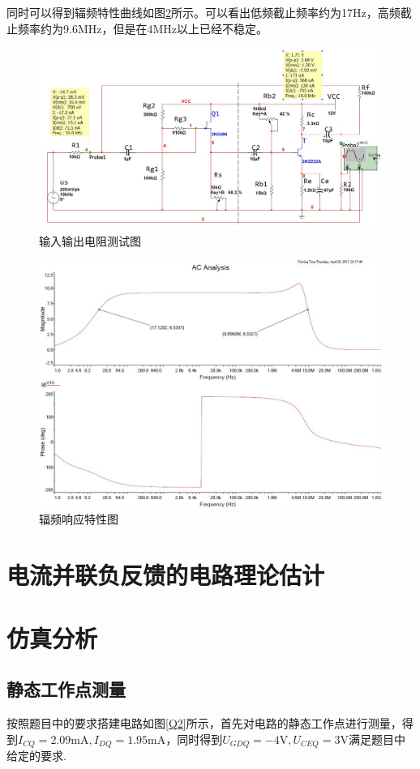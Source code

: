 \documentclass[UTF8,a4paper]{ctexart}
\begin{document}
同时可以得到辐频特性曲线如图\ref{F}所示。可以看出低频截止频率约为17Hz，高频截止频率约为9.6MHz，但是在4MHz以上已经不稳定。

\begin{figure}
\centering
\includegraphics[width=\textwidth]{R.jpg}
\caption{输入输出电阻测试图}
\label{R}
\end{figure}

\begin{figure}
\centering
\includegraphics[width=\textwidth]{F.jpg}
\caption{辐频响应特性图}
\label{F}
\end{figure}
\section{电流并联负反馈的电路理论估计}
\section{仿真分析}
\subsection{静态工作点测量}
按照题目中的要求搭建电路如图\ref{Q2}所示，首先对电路的静态工作点进行测量，得到$I_{CQ}=2.09\mathrm{mA},I_{DQ}=1.95\mathrm{mA}$，同时得到$U_{GDQ}=-4\mathrm{V},U_{CEQ}=3\mathrm{V}$满足题目中给定的要求.
\end{document}
